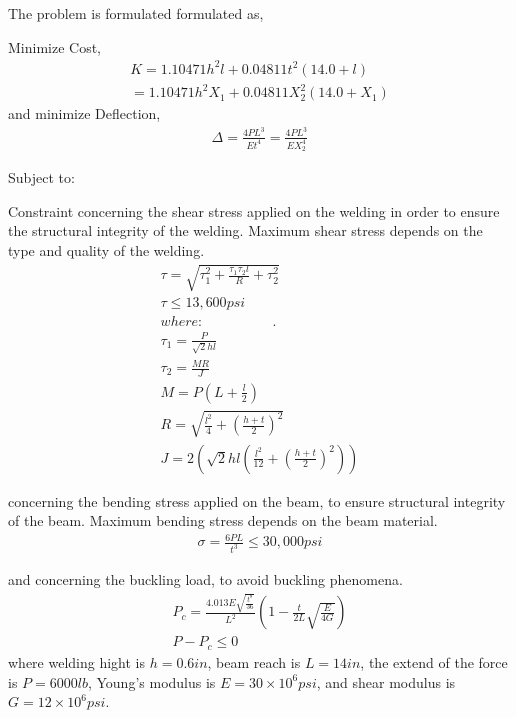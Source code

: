 The problem is formulated formulated as,

Minimize Cost,
\begin{eqnarray}\nonumber
   K = 1.10471h^2l+0.04811t^2(14.0+l) \\
   = 1.10471h^2X_1+0.04811X_2^2(14.0+X_1)
   \label{Cost} 
\end{eqnarray}
and minimize Deflection,
\begin{eqnarray}
   \Delta = \frac{4PL^3}{Et^4} = \frac{4PL^3}{EX_2^4}
   \label{Deflection} 
\end{eqnarray}

Subject to:


Constraint concerning the shear stress applied on the welding in order to ensure the structural integrity of the welding. Maximum shear stress depends on the type and quality of the welding. 
\begin{eqnarray}
   \tau = \sqrt{\tau_1^2 + \frac{\tau_1 \tau_2 l}{R} +\tau_2^2} \\
   \nonumber \tau \leq 13,600 psi \\
   \nonumber where:~~~~~~~~~~~~~~~~~~~~~~.\\
   \nonumber \tau_1 = \frac{P}{\sqrt{2}hl} \\
   \nonumber \tau_2 = \frac{MR}{J} \\   
   \nonumber M = P(L+\frac{l}{2}) \\ 
   \nonumber R = \sqrt{\frac{l^2}{4} + (\frac{h+t}{2})^2} \\
   \nonumber J = 2\left( \sqrt{2}hl\left( \frac{l^2}{12} + \left(\frac{h+t}{2}\right)^2 \right) \right)
   \label{shear} 
\end{eqnarray}

concerning the bending stress applied on the beam, to ensure structural integrity of the beam. Maximum bending stress depends on the beam material.
\begin{eqnarray}
   \sigma = \frac{6PL}{t^3} \leq 30,000 psi
   \label{bend} 
\end{eqnarray}

and concerning the buckling load, to avoid buckling phenomena.  
\begin{eqnarray}
   P_c = \frac{4.013E\sqrt{\frac{t^8}{36}}}{L^2}\left( 1- \frac{t}{2L}\sqrt{\frac{E}{4G}} \right) \\
   \nonumber  P - P_c \leq 0 
   \label{back} 
\end{eqnarray}
where welding hight is $h = 0.6 in$, beam reach is $L = 14 in$, the extend of the force is $P = 6000 lb$, Young’s modulus is $E = 30 \times 10^6 psi$, and shear modulus is $G = 12 \times 10^6 psi$.  

